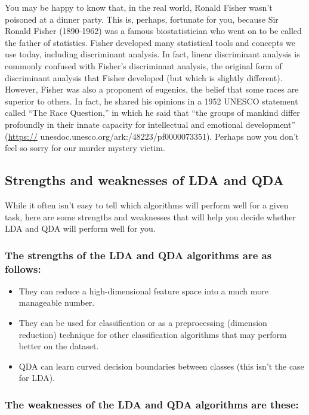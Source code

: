 \documentclass[
]{article}
\providecommand{\tightlist}{%
  \setlength{\itemsep}{0pt}\setlength{\parskip}{0pt}}
\begin{document}
You may be happy to know that, in the real world, Ronald Fisher wasn't
poisoned at a dinner party. This is, perhaps, fortunate for you, because
Sir Ronald Fisher (1890-1962) was a famous biostatistician who went on
to be called the father of statistics. Fisher developed many statistical
tools and concepts we use today, including discriminant analysis. In
fact, linear discriminant analysis is commonly confused with Fisher's
discriminant analysis, the original form of discriminant analysis that
Fisher developed (but which is slightly different). However, Fisher was
also a proponent of eugenics, the belief that some races are superior to
others. In fact, he shared his opinions in a 1952 UNESCO statement
called ``The Race Question,'' in which he said that ``the groups of
mankind differ profoundly in their innate capacity for intellectual and
emotional development'' (\url{https://}
unesdoc.unesco.org/ark:/48223/pf0000073351). Perhaps now you don't feel
so sorry for our murder mystery victim.

\subsection{Strengths and weaknesses of LDA and
QDA}\label{strengths-and-weaknesses-of-lda-and-qda}

While it often isn't easy to tell which algorithms will perform well for
a given task, here are some strengths and weaknesses that will help you
decide whether LDA and QDA will perform well for you.

\subsubsection{The strengths of the LDA and QDA algorithms are as
follows:}\label{the-strengths-of-the-lda-and-qda-algorithms-are-as-follows}

\begin{itemize}
\tightlist
\item
  They can reduce a high-dimensional feature space into a much more
  manageable number.
\item
  They can be used for classification or as a preprocessing (dimension
  reduction) technique for other classification algorithms that may
  perform better on the dataset.
\item
  QDA can learn curved decision boundaries between classes (this isn't
  the case for LDA).
\end{itemize}

\subsubsection{The weaknesses of the LDA and QDA algorithms are
these:}\label{the-weaknesses-of-the-lda-and-qda-algorithms-are-these}
\end{document}
